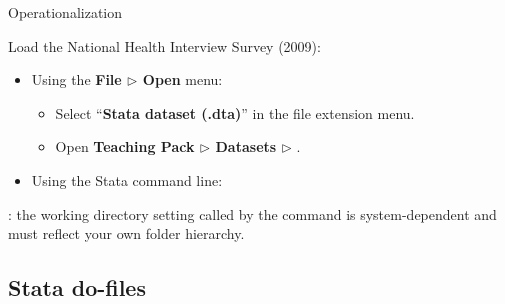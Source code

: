 \documentclass{beamer}
\begin{document}
	\begin{frame}[t]{Operationalization}
	
		Load the National Health Interview Survey (2009):
		
		\begin{itemize}
		
			\item Using the \textbf{File $\triangleright$ Open} menu:
			
			\begin{itemize}
				\item Select ``\textbf{Stata dataset (.dta)}'' in the file extension menu.
				\item Open \textbf{Teaching Pack $\triangleright$ Datasets $\triangleright$ }.
			\end{itemize}	
			
			\item Using the Stata command line:
			
			
			
			
			
		\end{itemize}
		
		: the working directory setting called by the  command is system-dependent and must reflect your own folder hierarchy.
	
	\end{frame}		
	
	\subsection{Stata do-files}
\end{document}
